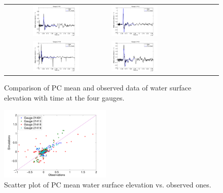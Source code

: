 \begin{figure}[h]
\begin{tabular}{clc}
%        
\includegraphics[width=0.475\textwidth]{./figures/compare1.pdf} &
\includegraphics[width=0.475\textwidth]{./figures/compare2.pdf} \\
\includegraphics[width=0.475\textwidth]{./figures/compare3.pdf} &
\includegraphics[width=0.475\textwidth]{./figures/compare4.pdf}
\end{tabular}
\caption{Comparison of PC mean 
and observed data of water surface elevation with time at the four gauges.}
\label{fig:compare}
\end{figure}  
\begin{figure}[h]
\centering
\includegraphics[width=0.475\textwidth]{./figures/scatter.pdf} 
\caption{Scatter plot of PC mean water surface elevation vs. observed ones.}
\label{fig:scatter}

\end{figure}  
